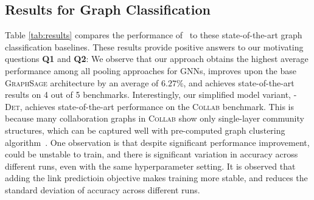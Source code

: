 \subsection{Results for Graph Classification}\label{sec:classification}
Table \ref{tab:results} compares the performance of \name\ to these state-of-the-art graph classification baselines.
These results provide positive answers to our motivating questions {\bf Q1} and {\bf Q2}:
We observe that our \name approach obtains the highest average performance among all pooling approaches for GNNs, improves upon the base \textsc{GraphSage} architecture by an average of $6.27\%$, and achieves state-of-the-art results on 4 out of 5 benchmarks. %
Interestingly, our simplified model variant, \textsc{\name-Det}, achieves state-of-the-art performance on the \textsc{Collab} benchmark. This is because many collaboration graphs in \textsc{Collab} show only single-layer community structures, which can be captured well with pre-computed graph clustering algorithm~\cite{dhillon2007weighted}.
One observation is that despite significant performance improvement, \name could be unstable to train, and there is significant variation in accuracy across different runs, even with the same hyperparameter setting. It is observed that adding the link predictioin objective makes training more stable, and reduces the standard deviation of accuracy across different runs.


